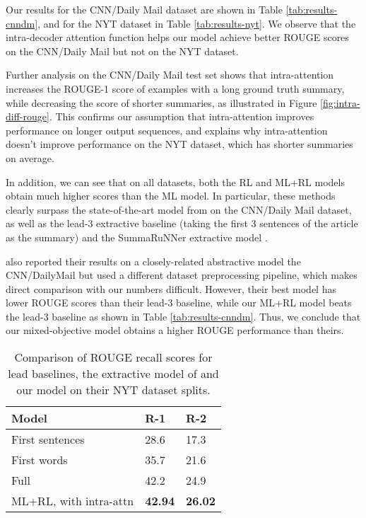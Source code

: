 \documentclass{article} \usepackage{iclr2018_arxiv,times}
\begin{document}
Our results for the CNN/Daily Mail dataset are shown in Table \ref{tab:results-cnndm}, and for the NYT dataset in Table \ref{tab:results-nyt}. We observe that the intra-decoder attention function helps our model achieve better ROUGE scores on the CNN/Daily Mail but not on the NYT dataset.

Further analysis on the CNN/Daily Mail test set shows that intra-attention increases the ROUGE-1 score of examples with a long ground truth summary, while decreasing the score of shorter summaries, as illustrated in Figure \ref{fig:intra-diff-rouge}. This confirms our assumption that intra-attention improves performance on longer output sequences, and explains why intra-attention doesn’t improve performance on the NYT dataset, which has shorter summaries on average.

In addition, we can see that on all datasets, both the RL and ML+RL models obtain much higher scores than the ML model. In particular, these methods clearly surpass the state-of-the-art model from \citet{nallapati2016} on the CNN/Daily Mail dataset, as well as the lead-3 extractive baseline (taking the first 3 sentences of the article as the summary) and the SummaRuNNer extractive model \citep{nallapati2017}.

\citet{see2017} also reported their results on a closely-related abstractive model the CNN/DailyMail but used a different dataset preprocessing pipeline, which makes direct comparison with our numbers difficult. However, their best model has lower ROUGE scores than their lead-3 baseline, while our ML+RL model beats the lead-3 baseline as shown in Table \ref{tab:results-cnndm}. Thus, we conclude that our mixed-objective model obtains a higher ROUGE performance than theirs.

\begin{table}
\centering
\begin{tabular}{|l|l|l|}
\hline
{\bf Model} & {\bf R-1} & {\bf R-2} \\\hline
First sentences & 28.6 & 17.3\\
First  words & 35.7 & 21.6\\\hline
Full \citep{durrett2016learning} & 42.2 & 24.9\\\hline
ML+RL, with intra-attn & \bf 42.94 & \bf 26.02 \\\hline
\end{tabular}
\caption{Comparison of ROUGE recall scores for lead baselines, the extractive model of \protect\citet{durrett2016learning} and our model on their NYT dataset splits.}
\label{tab:nyt-baseline-results}
\end{table}
\end{document}
